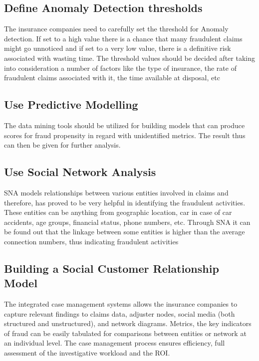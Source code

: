 \documentclass[sigconf]{acmart}
\begin{document}
\subsection{Define Anomaly Detection thresholds}
The insurance companies need to carefully set the threshold for Anomaly detection. If set to a high value there is a chance that many fraudulent claims might go unnoticed and if set to a very low value, there is a definitive risk associated with wasting time. The threshold values should be decided after taking into consideration a number of factors like the type of insurance, the rate of fraudulent claims associated with it, the time available at disposal, etc
\subsection{Use Predictive Modelling}
The data mining tools should be utilized for building models that can produce scores for fraud propensity in regard with unidentified metrics. The result thus can then be given for further analysis.
\subsection{Use Social Network Analysis}
SNA models relationships between various entities involved in claims and therefore, has proved to be very helpful in identifying the fraudulent activities. These entities can be anything from geographic location, car in case of car accidents, age groups, financial status, phone numbers, etc. Through SNA it can be found out that the linkage between some entities is higher than the average connection numbers, thus indicating fraudulent activities
\subsection{Building a Social Customer Relationship Model}
The integrated case management systems allows the insurance companies to capture relevant findings to claims data, adjuster nodes, social media (both structured and unstructured), and network diagrams. Metrics, the key indicators of fraud can be easily tabulated for comparisons between entities or network at an individual level. The case management process ensures efficiency, full assessment of the investigative workload and the ROI.
\end{document}
